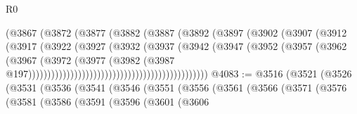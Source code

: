 \begin{lexlean}{R0}
\begin{coremodule}
                                                (@3867
                                                  (@3872
                                                    (@3877
                                                      (@3882
                                                        (@3887
                                                          (@3892
                                                            (@3897
                                                              (@3902
                                                                (@3907
                                                                  (@3912
                                                                    (@3917
                                                                      (@3922
                                                                        (@3927
                                                                          (@3932
                                                                            (@3937
                                                                              (@3942
                                                                                (@3947
                                                                                  (@3952
                                                                                    (@3957
                                                                                      (@3962
                                                                                        (@3967
                                                                                          (@3972
                                                                                            (@3977
                                                                                              (@3982
                                                                                                (@3987
                                                                                                  @197)))))))))))))))))))))))))))))))))))))))))))))))
@4083 := @3516
    (@3521
      (@3526
        (@3531
          (@3536
            (@3541
              (@3546
                (@3551
                  (@3556
                    (@3561
                      (@3566
                        (@3571
                          (@3576
                            (@3581
                              (@3586
                                (@3591
                                  (@3596
                                    (@3601
                                      (@3606

\end{coremodule}
\end{lexlean}
